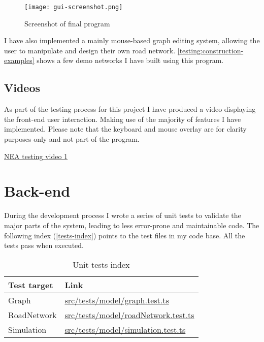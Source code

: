         \begin{figure}
            \centering
            \texttt{[image: gui-screenshot.png]}
            \caption{Screenshot of final program}
            \label{testing:gui-screenshot}
        \end{figure}

        I have also implemented a mainly mouse-based graph editing system, allowing the user to manipulate and design their own road network. \autoref{testing:construction-examples} shows a few demo networks I have built using this program.


    \subsection{Videos}

        As part of the testing process for this project I have produced a video displaying the front-end user interaction. Making use of the majority of features I have implemented. Please note that the keyboard and mouse overlay are for clarity purposes only and not part of the program.

        \href{https://youtu.be/RnU7ZQtnQWU}{NEA testing video 1}

\section{Back-end}

    During the development process I wrote a series of unit tests to validate the major parts of the system, leading to less error-prone and maintainable code. The following index (\autoref{tests-index}) points to the test files in my code base. All the tests pass when executed.

    \begin{table}
        \begin{tabular}{|p{}|p{}|}
            \hline
            \textbf{Test target} & \textbf{Link}\\\hline
            Graph & \href{https://github.com/joshua-smart/traffic-simulator/blob/main/src/tests/model/graph.test.ts}{src/tests/model/graph.test.ts}\\\hline
            RoadNetwork & \href{https://github.com/joshua-smart/traffic-simulator/blob/main/src/tests/model/roadNetwork.test.ts}{src/tests/model/roadNetwork.test.ts}\\\hline
            Simulation & \href{https://github.com/joshua-smart/traffic-simulator/blob/main/src/tests/model/simulation.test.ts}{src/tests/model/simulation.test.ts}\\\hline
        \end{tabular}
        \caption{Unit tests index}
        \label{tests-index}
    \end{table}
